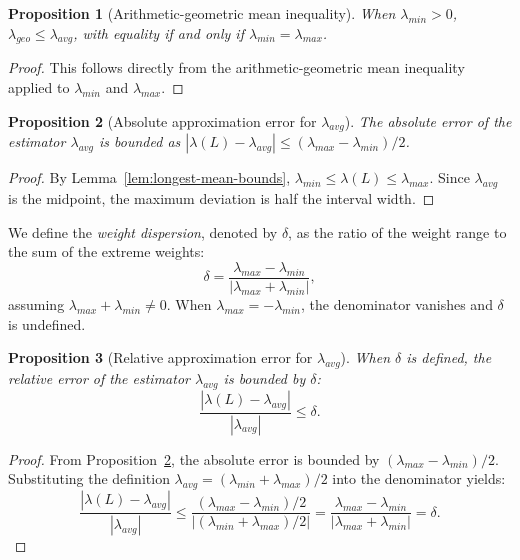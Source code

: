 \documentclass{article}
\newtheorem{prop}{Proposition}[section]
\theoremstyle{definition}
\begin{document}
\begin{prop}[Arithmetic-geometric mean inequality]
\label{prop:am-gm}
When $\lambda_{min} > 0$, $\lambda_{geo} \leq \lambda_{avg}$, with
equality if and only if $\lambda_{min} = \lambda_{max}$.
\end{prop}

\begin{proof}
This follows directly from the arithmetic-geometric mean inequality
applied to $\lambda_{min}$ and $\lambda_{max}$.
\end{proof}

\begin{prop}[Absolute approximation error for $\lambda_{avg}$]
  \label{prop:abs-approx-error}
The absolute error of the estimator $\lambda_{avg}$ is bounded as
$|\lambda(L) - \lambda_{avg}| \leq (\lambda_{max} - \lambda_{min})/2$.
\end{prop}

\begin{proof}
By Lemma~\ref{lem:longest-mean-bounds}, $\lambda_{min} \leq \lambda(L)
\leq \lambda_{max}$. Since $\lambda_{avg}$ is the midpoint, the
maximum deviation is half the interval width.
\end{proof}

We define the \textit{weight dispersion}, denoted by $\delta$, as the ratio of
the weight range to the sum of the extreme weights:
\begin{equation}
\delta = \frac{\lambda_{max} - \lambda_{min}}{|\lambda_{max} + \lambda_{min}|},
\end{equation}
assuming $\lambda_{max} + \lambda_{min} \neq 0$. When $\lambda_{max} =
-\lambda_{min}$, the denominator vanishes and $\delta$ is undefined.

\begin{prop}[Relative approximation error for $\lambda_{avg}$]
\label{prop:rel-approx-error}
When $\delta$ is defined, the relative error of the estimator
$\lambda_{avg}$ is bounded by $\delta$:
\begin{equation}
\frac{|\lambda(L) - \lambda_{avg}|}{|\lambda_{avg}|} \leq \delta.
\end{equation}
\end{prop}

\begin{proof}
From Proposition~\ref{prop:abs-approx-error}, the absolute error is
bounded by $(\lambda_{max} - \lambda_{min})/2$.  Substituting the
definition $\lambda_{avg} = (\lambda_{min} + \lambda_{max})/2$ into
the denominator yields:
$$ \frac{|\lambda(L) - \lambda_{avg}|}{|\lambda_{avg}|} \leq
\frac{(\lambda_{max} - \lambda_{min})/2}{|(\lambda_{min} +
  \lambda_{max})/2|} = \frac{\lambda_{max} -
  \lambda_{min}}{|\lambda_{max} + \lambda_{min}|} = \delta.
$$
\end{proof}
\end{document}
